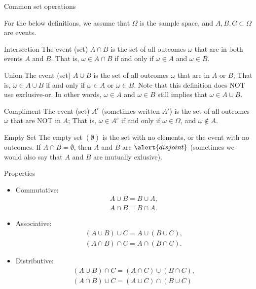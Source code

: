 \begin{frame}[allowframebreaks]{Common set operations}

For the below definitions, we assume that $\Omega$ is the sample space, and $A, B, C \subset \Omega$ are events.
    \begin{block}{Intersection}
      The event (set) $A \cap B$ is the set of all outcomes $\omega$ that are in both events $A$ and $B$. That is, $\omega \in A \cap B$ if and only if $\omega \in A$ and $\omega \in B$.
  \end{block}
  
      \begin{block}{Union}
      The event (set) $A \cup B$ is the set of all outcomes $\omega$ that are in $A$ or $B$; That is, $\omega \in A \cup B$ if and only if $\omega \in A$ or $\omega \in B$. Note that this definition does NOT use exclusive-or. In other words, $\omega \in A$ and $\omega \in B$ still implies that $\omega \in A \cup B$.
  \end{block}
  
  \begin{block}{Compliment}
      The event (set) $A^c$ (sometimes written $A'$) is the set of all outcomes $\omega$ that are NOT in $A$; That is, $\omega \in A^c$ if and only if $\omega \in \Omega$, and $\omega \notin A$.
  \end{block}
  
  \begin{block}{Empty Set}
    The \alert{empty set} $(\emptyset)$ is the set with no elements, or the event with no outcomes. If $A \cap B = \emptyset$, then $A$ and $B$ are $\alert{disjoint}$ (sometimes we would also say that $A$ and $B$ are mutually exlusive).
  \end{block}
  
\end{frame}

\begin{frame}[allowframebreaks]{Properties}
  \begin{itemize}
    \item Commutative: 
    \begin{align*}A \cup B = B \cup A,\\
    A \cap B = B \cap A.\end{align*}
    \item Associative: 
    \begin{align*}(A \cup B) \cup C = A \cup (B \cup C),\\ 
    (A \cap B) \cap C = A \cap (B \cap C).
    \end{align*}
    \item Distributive: 
    \begin{align*}
    (A \cup B) \cap C = (A \cap C) \cup (B \cap C),\\
    (A \cap B) \cup C = (A \cup C) \cap (B \cup C)
    \end{align*}
  \end{itemize}
\end{frame}

